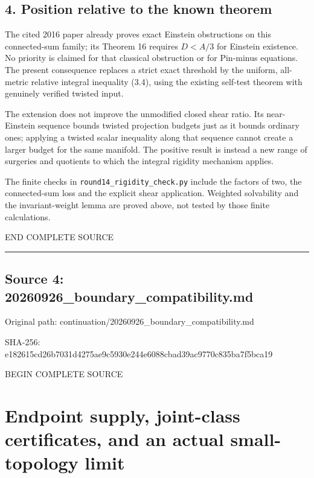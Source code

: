 \documentclass[
  10pt,
]{article}
\begin{document}
\hypertarget{position-relative-to-the-known-theorem}{%
\subsection{4. Position relative to the known
theorem}\label{position-relative-to-the-known-theorem}}

The cited 2016 paper already proves exact Einstein obstructions on this
connected-sum family; its Theorem 16 requires \(D<A/3\) for Einstein
existence. No priority is claimed for that classical obstruction or for
Pin-minus equations. The present consequence replaces a strict exact
threshold by the uniform, all-metric relative integral inequality (3.4),
using the existing self-test theorem with genuinely verified twisted
input.

The extension does not improve the unmodified closed shear ratio. Its
near-Einstein sequence bounds twisted projection budgets just as it
bounds ordinary ones; applying a twisted scalar inequality along that
sequence cannot create a larger budget for the same manifold. The
positive result is instead a new range of surgeries and quotients to
which the integral rigidity mechanism applies.

The finite checks in \texttt{round14\_rigidity\_check.py} include the
factors of two, the connected-sum loss and the explicit shear
application. Weighted solvability and the invariant-weight lemma are
proved above, not tested by those finite calculations.

END COMPLETE SOURCE

\begin{center}\rule{0.5\linewidth}{0.5pt}\end{center}

\hypertarget{source-4-20260926_boundary_compatibility.md}{%
\subsection{Source 4:
20260926\_boundary\_compatibility.md}\label{source-4-20260926_boundary_compatibility.md}}

Original path: continuation/20260926\_boundary\_compatibility.md

SHA-256:
e182615cd26b7031d4275ae9c5930e244e6088cbad39ac9770c835ba7f5bca19

BEGIN COMPLETE SOURCE

\hypertarget{endpoint-supply-joint-class-certificates-and-an-actual-small-topology-limit}{%
\section{Endpoint supply, joint-class certificates, and an actual
small-topology
limit}\label{endpoint-supply-joint-class-certificates-and-an-actual-small-topology-limit}}
\end{document}
